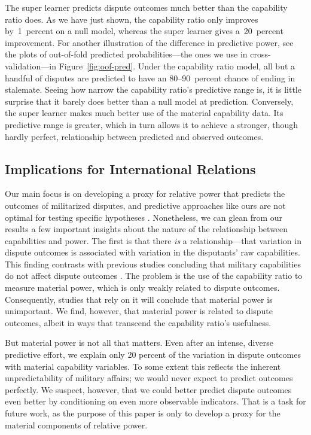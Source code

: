 The super learner predicts dispute outcomes much better than the capability ratio does.
As we have just shown, the capability ratio only improves by~1~percent on a null model, whereas the super learner gives a~20~percent improvement.
For another illustration of the difference in predictive power, see the plots of out-of-fold predicted probabilities---the ones we use in cross-validation---in Figure~\ref{fig:oof-pred}.
Under the capability ratio model, all but a handful of disputes are predicted to have an 80--90~percent chance of ending in stalemate.
Seeing how narrow the capability ratio's predictive range is, it is little surprise that it barely does better than a null model at prediction.
Conversely, the super learner makes much better use of the material capability data.
Its predictive range is greater, which in turn allows it to achieve a stronger, though hardly perfect, relationship between predicted and observed outcomes.

\subsection{Implications for International Relations}

Our main focus is on developing a proxy for relative power that predicts the outcomes of militarized disputes, and predictive approaches like ours are not optimal for testing specific hypotheses \citep{Shmueli:2010jd}.
Nonetheless, we can glean from our results a few important insights about the nature of the relationship between capabilities and power.
The first is that there \emph{is} a relationship---that variation in dispute outcomes is associated with variation in the disputants' raw capabilities.
This finding contrasts with previous studies concluding that military capabilities do not affect dispute outcomes \citep{Maoz:1983cw}.
The problem is the use of the capability ratio to measure material power, which is only weakly related to dispute outcomes.
Consequently, studies that rely on it will conclude that material power is unimportant.
We find, however, that material power is related to dispute outcomes, albeit in ways that transcend the capability ratio's usefulness.

But material power is not all that matters.
Even after an intense, diverse predictive effort, we explain only 20 percent of the variation in dispute outcomes with material capability variables.
To some extent this reflects the inherent unpredictability of military affairs; we would never expect to predict outcomes perfectly.
We suspect, however, that we could better predict dispute outcomes even better by conditioning on even more observable indicators.
That is a task for future work, as the purpose of this paper is only to develop a proxy for the material components of relative power.

